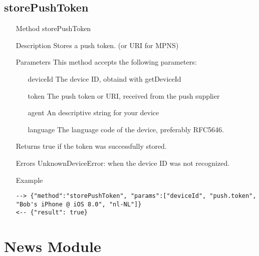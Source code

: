 \documentclass[a4paper]{scrreprt}
\begin{document}
\clearpage

\subsection{storePushToken}
\begin{enumerate}
\item[Method] storePushToken
\item[Description] Stores a push token. (or URI for MPNS)
\item[Parameters] This method accepts the following parameters:
	\begin{enumerate}
		\item[deviceId] The device ID, obtaind with getDeviceId
  		\item[token] The push token or URI, received from the push supplier
    	\item[agent] An descriptive string for your device
    	\item[language] The language code of the device, preferably RFC5646.
	\end{enumerate}
\item[Returns] true if the token was successfully stored.
\item[Errors] UnknownDeviceError: when the device ID was not recognized.
\item[Example]
\begin{lstlisting}
--> {"method":"storePushToken", "params":["deviceId", "push.token", "Bob's iPhone @ iOS 8.0", "nl-NL"]}
<-- {"result": true}
\end{lstlisting}
\end{enumerate}

\clearpage


\section{News Module}
\end{document}
